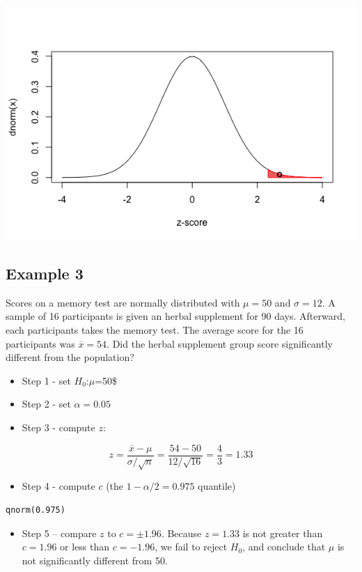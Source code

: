 \documentclass[11pt]{article}
\begin{document}
\includegraphics[width=.9\linewidth]{figures/week4/example2.png}


\subsection*{Example 3}
\label{sec-1-5}
Scores on a memory test are normally distributed with $\mu=50$ and $\sigma=12$.  A sample of 16 participants is given an herbal supplement for 90 days.  Afterward, each participants takes the memory test.  The average score for the 16 participants was $\overline{x}=54$.  Did the herbal supplement group score significantly different from the population?

\begin{itemize}
\item Step 1 - set $H_0$:$\mu$=50\$
\item Step 2 - set $\alpha=0.05$
\item Step 3 - compute $z$:
\end{itemize}

\[
z=\frac{\overline{x}-\mu}{\sigma/\sqrt{n}} =\frac{54-50}{12/\sqrt{16}} = \frac{4}{3} = 1.33
\]

\begin{itemize}
\item Step 4 - compute $c$ (the $1-\alpha/2 = 0.975$ quantile)
\end{itemize}

\begin{verbatim}
qnorm(0.975)
\end{verbatim}

\begin{itemize}
\item Step 5 -- compare $z$ to $c=\pm 1.96$.  Because $z=1.33$ is not greater than $c=1.96$ or less than $c=-1.96$, we fail to reject $H_0$, and conclude that $\mu$ is not significantly different from 50.
\end{itemize}
\end{document}
